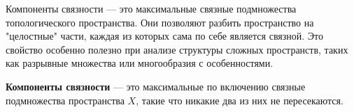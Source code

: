 


Компоненты связности — это максимальные связные подмножества топологического пространства. Они позволяют разбить пространство на "целостные" части, каждая из которых сама по себе является связной. Это свойство особенно полезно при анализе структуры сложных пространств, таких как разрывные множества или многообразия с особенностями.

\begin{definition}
\textbf{Компоненты связности} — это максимальные по включению связные подмножества пространства $ X $, такие что никакие два из них не пересекаются.
\end{definition}

